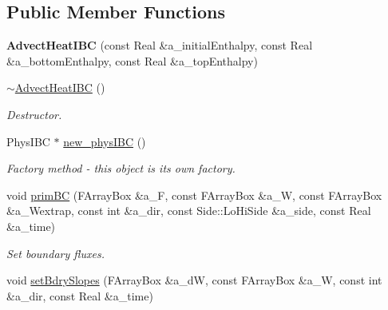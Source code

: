\subsection*{Public Member Functions}
\begin{DoxyCompactItemize}
\item 
\hypertarget{class_advect_heat_i_b_c_a50dc645f3ed94a2c823b48d7bed96aa9}{{\bfseries Advect\-Heat\-I\-B\-C} (const Real \&a\-\_\-initial\-Enthalpy, const Real \&a\-\_\-bottom\-Enthalpy, const Real \&a\-\_\-top\-Enthalpy)}\label{class_advect_heat_i_b_c_a50dc645f3ed94a2c823b48d7bed96aa9}

\item 
\hypertarget{class_advect_heat_i_b_c_a99913dd12f575e4fca93f120a7da8e1a}{\hyperlink{class_advect_heat_i_b_c_a99913dd12f575e4fca93f120a7da8e1a}{$\sim$\-Advect\-Heat\-I\-B\-C} ()}\label{class_advect_heat_i_b_c_a99913dd12f575e4fca93f120a7da8e1a}

\begin{DoxyCompactList}\small\item\em Destructor. \end{DoxyCompactList}\item 
\hypertarget{class_advect_heat_i_b_c_abc1ada950e7b317a958cf35fe3ef8264}{Phys\-I\-B\-C $\ast$ \hyperlink{class_advect_heat_i_b_c_abc1ada950e7b317a958cf35fe3ef8264}{new\-\_\-phys\-I\-B\-C} ()}\label{class_advect_heat_i_b_c_abc1ada950e7b317a958cf35fe3ef8264}

\begin{DoxyCompactList}\small\item\em Factory method -\/ this object is its own factory. \end{DoxyCompactList}\item 
\hypertarget{class_advect_heat_i_b_c_aed17ae0a2d062e6c7208d90f65e7a900}{void \hyperlink{class_advect_heat_i_b_c_aed17ae0a2d062e6c7208d90f65e7a900}{prim\-B\-C} (F\-Array\-Box \&a\-\_\-\-F, const F\-Array\-Box \&a\-\_\-\-W, const F\-Array\-Box \&a\-\_\-\-Wextrap, const int \&a\-\_\-dir, const Side\-::\-Lo\-Hi\-Side \&a\-\_\-side, const Real \&a\-\_\-time)}\label{class_advect_heat_i_b_c_aed17ae0a2d062e6c7208d90f65e7a900}

\begin{DoxyCompactList}\small\item\em Set boundary fluxes. \end{DoxyCompactList}\item 
\hypertarget{class_advect_heat_i_b_c_ae9eb24dc6b17491e3ca92f0957703fe5}{void \hyperlink{class_advect_heat_i_b_c_ae9eb24dc6b17491e3ca92f0957703fe5}{set\-Bdry\-Slopes} (F\-Array\-Box \&a\-\_\-d\-W, const F\-Array\-Box \&a\-\_\-\-W, const int \&a\-\_\-dir, const Real \&a\-\_\-time)}\label{class_advect_heat_i_b_c_ae9eb24dc6b17491e3ca92f0957703fe5}


\end{DoxyCompactItemize}
